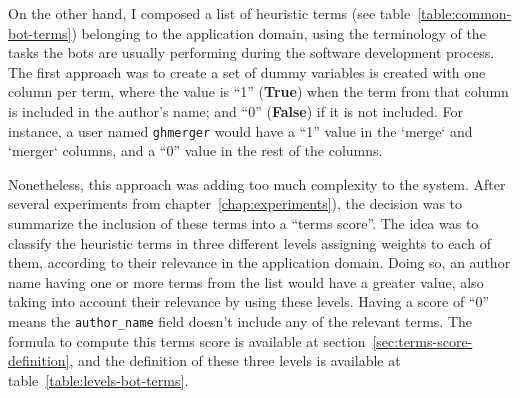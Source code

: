 \documentclass[a4paper, 12pt]{book}
\begin{document}
On the other hand, I composed a list of heuristic terms (see table~\ref{table:common-bot-terms}) belonging to the application domain, using the terminology of the tasks the bots are usually performing during the software development process.  The first approach was to create a set of dummy variables is created with one column per term, where the value is ``1'' (\textbf{True}) when the term from that column is included in the author's name; and ``0'' (\textbf{False}) if it is not included. For instance, a user named \texttt{ghmerger} would have a ``1'' value in the `merge` and `merger` columns, and a ``0'' value in the rest of the columns. 

Nonetheless, this approach was adding too much complexity to the system. After several experiments from chapter~\ref{chap:experiments}), the decision was to summarize the inclusion of these terms into a ``terms score''. The idea was to classify the heuristic terms in three different levels assigning weights to each of them, according to their relevance in the application domain. Doing so, an author name having one or more terms from the list would have a greater value, also taking into account their relevance by using these levels. Having a score of ``0'' means the \texttt{author\_name} field doesn't include any of the relevant terms. The formula to compute this terms score is available at section~\ref{sec:terms-score-definition}, and the definition of these three levels is available at table~\ref{table:levels-bot-terms}. 
\end{document}
